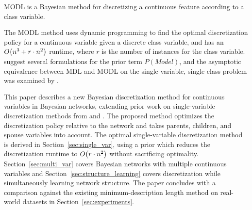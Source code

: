 MODL \citep{Boulle_2006} is a Bayesian method for discretizing a continuous feature according to a class variable. 



The MODL method uses dynamic programming to find the optimal discretization policy for a continuous variable given a discrete class variable, and has an $\bigo\paren{n^3 + r \cdot n^2}$ runtime, where $r$ is the number of instances for the class variable.
\cite{Lustgarten_2011} suggest several formulations for the prior term $P(\textit{Model})$, and the asymptotic equivalence between MDL and MODL on the single-variable, single-class problem was examined by \citet{VL_2000}.

This paper describes a new Bayesian discretization method for continuous variables in Bayesian networks, extending prior work on single-variable discretization methods from \citet{Boulle_2006} and \citet{Lustgarten_2011}.
The proposed method optimizes the discretization policy relative to the network and takes parents, children, and spouse variables into account.
The optimal single-variable discretization method is derived in Section~\ref{sec:single_var}, using a prior which reduces the discretization runtime to $\bigo\paren{r \cdot n^2}$ without sacrificing optimality.
Section~\ref{sec:multi_var} covers Bayesian networks with multiple continuous variables and Section~\ref{sec:structure_learning} covers discretization while simultaneously learning network structure.
The paper concludes with a comparison against the existing minimum-description length \citep{Friedman_1996} method on real-world datasets in Section~\ref{sec:experiments}.

